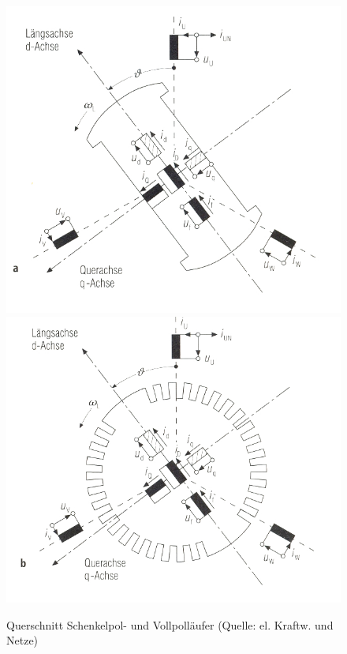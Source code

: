 \documentclass{scrartcl}
\begin{document}
\begin{onehalfspace}
	\begin{figure}[H]
	\centering
	\includegraphics[scale=0.85]{img/schenkelpol.jpg}
	\includegraphics[scale=0.85]{img/vollpol.jpg}
	\caption{Querschnitt Schenkelpol- und Vollpolläufer (Quelle: el. Kraftw. und Netze)}
	\end{figure}

	\begin{figure}[H]
	\centering


\end{figure}
\end{onehalfspace}
\end{document}
